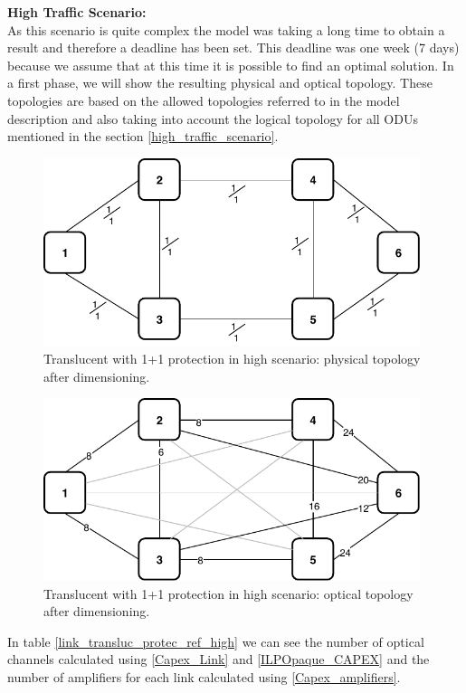 \clearpage
\textbf{High Traffic Scenario:}\\

As this scenario is quite complex the model was taking a long time to obtain a result and therefore a deadline has been set. This deadline was one week (7 days) because we assume that at this time it is possible to find an optimal solution.
In a first phase, we will show the resulting physical and optical topology. These topologies are based on the allowed topologies referred to in the model description and also taking into account the logical topology for all ODUs mentioned in the section \ref{high_traffic_scenario}. \\

\begin{figure}[h!]
\centering
\includegraphics[width=11cm]{sdf/ilp/translucent_protection/figures/physical_topology}
\caption{Translucent with 1+1 protection in high scenario: physical topology after dimensioning.}
\label{physical3_protectionhigh}
\end{figure}

\begin{figure}[h!]
\centering
\includegraphics[width=11cm]{sdf/ilp/translucent_protection/figures/optical_topology_high}
\caption{Translucent with 1+1 protection in high scenario: optical topology after dimensioning.}
\label{optical3_protectionhigh}
\end{figure}

In table \ref{link_transluc_protec_ref_high} we can see the number of optical channels calculated using \ref{Capex_Link} and \ref{ILPOpaque_CAPEX} and the number of amplifiers for each link calculated using \ref{Capex_amplifiers}.\\

